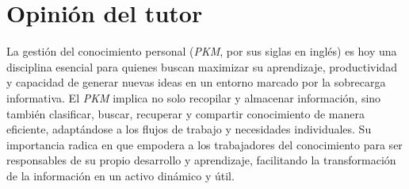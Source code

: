 






\chapter*{Opinión del tutor}
La gestión del conocimiento personal (\textit{PKM}, por sus siglas en inglés) es hoy una disciplina esencial para quienes buscan maximizar su aprendizaje, productividad y capacidad de generar nuevas ideas en un entorno marcado por la sobrecarga informativa. El \textit{PKM} implica no solo recopilar y almacenar información, sino también clasificar, buscar, recuperar y compartir conocimiento de manera eficiente, adaptándose a los flujos de trabajo y necesidades individuales. Su importancia radica en que empodera a los trabajadores del conocimiento para ser responsables de su propio desarrollo y aprendizaje, facilitando la transformación de la información en un activo dinámico y útil.

